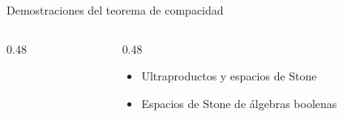 \begin{frame}{Demostraciones del teorema de compacidad}
    \begin{columns}
      \begin{column}{0.48\textwidth}
         
      \end{column}
      \begin{column}{0.48\textwidth}
         \begin{itemize}
            \item Ultraproductos y espacios de Stone
            \item Espacios de Stone de álgebras boolenas
         \end{itemize}
      \end{column}
   \end{columns}
\end{frame}


